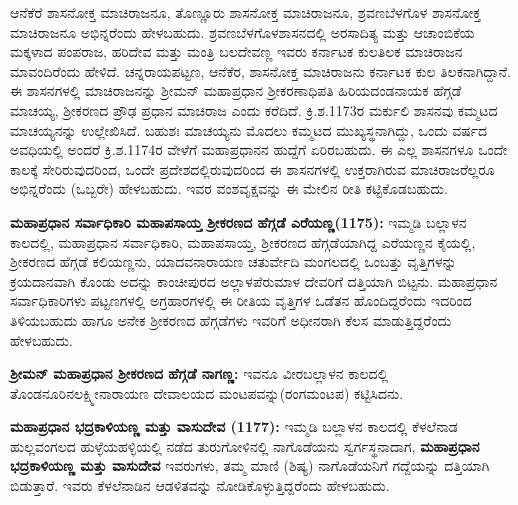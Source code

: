 ಆನೆಕೆರೆ ಶಾಸನೋಕ್ತ ಮಾಚಿರಾಜನೂ, ತೊಣ್ಣೂರು ಶಾಸನೋಕ್ತ ಮಾಚಿರಾಜನೂ, ಶ್ರವಣಬೆಳಗೊಳ ಶಾಸನೋಕ್ತ ಮಾಚಿರಾಜನೂ ಅಭಿನ್ನರೆಂದು ಹೇಳಬಹುದು. ಶ್ರವಣಬೆಳಗೊಳಶಾಸನದಲ್ಲಿ ಅರಸಾದಿತ್ಯ ಮತ್ತು ಆಚಾಂಬಿಕೆಯ ಮಕ್ಕಳಾದ ಪಂಪರಾಜ, ಹರಿದೇವ ಮತ್ತು ಮಂತ್ರಿ ಬಲದೇವಣ್ಣ ಇವರು ಕರ್ನಾಟಕ ಕುಲತಿಲಕ ಮಾಚಿರಾಜನ ಮಾವಂದಿರೆಂದು ಹೇಳಿದೆ. ಚನ್ನರಾಯಪಟ್ಟಣ, ಆನೆಕೆರ, ಶಾಸನೋಕ್ತ ಮಾಚಿರಾಜನು ಕರ್ನಾಟಕ ಕುಲ ತಿಲಕನಾಗಿದ್ದಾನೆ. ಈ ಶಾಸನಗಳಲ್ಲಿ ಮಾಚಿರಾಜನನ್ನು ಶ‍್ರೀಮನ್​ ಮಹಾಪ್ರಧಾನ ಶ‍್ರೀಕರಣಾಧಿಪತಿ ಹಿರಿಯದಂಡನಾಯಕ ಹೆಗ್ಗಡೆ ಮಾಚಯ್ಯ, ಶ‍್ರೀಕರಣದ ಪ್ರೌಢ ಪ್ರಧಾನ ಮಾಚಿರಾಜ ಎಂದು ಕರೆದಿದೆ. ಕ್ರಿ.ಶ.1173ರ ಮರ್ಕುಲಿ ಶಾಸನವು ಕಮ್ಮಟದ ಮಾಚಯ್ಯನನ್ನು ಉಲ್ಲೇಖಿಸಿದೆ. ಬಹುಶಃ ಮಾಚಯ್ಯನು ಮೊದಲು ಕಮ್ಮಟದ ಮುಖ್ಯಸ್ಥನಾಗಿದ್ದು, ಒಂದು ವರ್ಷದ ಅವಧಿಯಲ್ಲಿ ಅಂದರೆ ಕ್ರಿ.ಶ.1174ರ ವೇಳೆಗೆ ಮಹಾಪ್ರಧಾನನ ಹುದ್ದೆಗೆ ಏರಿರಬಹುದು. ಈ ಎಲ್ಲ ಶಾಸನಗಳೂ ಒಂದೇ ಕಾಲಕ್ಕೆ ಸೇರಿರುವುದರಿಂದ, ಒಂದೇ ಪ್ರದೇಶದಲ್ಲಿರುವುದರಿಂದ ಈ ಶಾಸನಗಳಲ್ಲಿ ಉಕ್ತರಾಗಿರುವ ಮಾಚಿರಾಜರೆಲ್ಲರೂ ಅಭಿನ್ನರೆಂದು (ಒಬ್ಬರೇ) ಹೇಳಬಹುದು. ಇವರ ವಂಶವೃಕ್ಷವನ್ನು ಈ ಮೇಲಿನ ರೀತಿ ಕಟ್ಟಿಕೊಡಬಹುದು.

\textbf{ಮಹಾಪ್ರಧಾನ ಸರ್ವಾಧಿಕಾರಿ ಮಹಾಪಸಾಯ್ತ ಶ‍್ರೀಕರಣದ ಹೆಗ್ಗಡೆ ಎರೆಯಣ್ಣ(1175):} ಇಮ್ಮಡಿ ಬಲ್ಲಾಳನ ಕಾಲದಲ್ಲಿ, ಮಹಾಪ್ರಧಾನ ಸರ್ವಾಧಿಕಾರಿ, ಮಹಾಪಸಾಯ್ತ, ಶ‍್ರೀಕರಣದ ಹೆಗ್ಗಡೆಯಾಗಿದ್ದ ಎರೆಯಣ್ಣನ ಕೈಯಲ್ಲಿ, ಶ‍್ರೀಕರಣದ ಹೆಗ್ಗಡೆ ಕಲಿಯಣ್ಣನು, ಯಾದವನಾರಾಯಣ ಚತುರ್ವೇದಿ ಮಂಗಲದಲ್ಲಿ ಒಂಬತ್ತು ವೃತ್ತಿಗಳನ್ನು ಕ್ರಯದಾನವಾಗಿ ಕೊಂಡು ಅದನ್ನು ಕಾಂಚೀಪುರದ ಅಲ್ಲಾಳಪೆರುಮಾಳ ದೇವರಿಗೆ ದತ್ತಿಯಾಗಿ ಬಿಟ್ಟನು. ಮಹಾಪ್ರಧಾನ ಸರ್ವಾಧಿಕಾರಿಗಳು ಪಟ್ಟಣಗಳಲ್ಲಿ ಅಗ್ರಹಾರಗಳಲ್ಲಿ ಈ ರೀತಿಯ ವೃತ್ತಿಗಳ ಒಡೆತನ ಹೊಂದಿದ್ದರೆಂದು ಇದರಿಂದ ತಿಳಿಯಬಹುದು ಹಾಗೂ ಅನೇಕ ಶ‍್ರೀಕರಣದ ಹೆಗ್ಗಡೆಗಳು ಇವರಿಗೆ ಅಧೀನರಾಗಿ ಕೆಲಸ ಮಾಡುತ್ತಿದ್ದರೆಂದು ಹೇಳಬಹುದು.

\textbf{ಶ‍್ರೀಮನ್​ ಮಹಾಪ್ರಧಾನ ಶ‍್ರೀಕರಣದ ಹೆಗ್ಗಡೆ ನಾಗಣ್ಣ:} ಇವನೂ ವೀರಬಲ್ಲಾಳನ ಕಾಲದಲ್ಲಿ ತೊಂಡನೂರಿನ\break ಲಕ್ಷ್ಮೀನಾರಾಯಣ ದೇವಾಲಯದ ಮಂಟಪವನ್ನು(ರಂಗಮಂಟಪ) ಕಟ್ಟಿಸಿದನು.

\textbf{ಮಹಾಪ್ರಧಾನ ಭದ್ರಕಾಳಿಯಣ್ಣ ಮತ್ತು ವಾಸುದೇವ (1177):} ಇಮ್ಮಡಿ ಬಲ್ಲಾಳನ ಕಾಲದಲ್ಲಿ ಕೆಳಲೆನಾಡ ಹುಲ್ಲವಂಗಲದ ಹುಳ್ಳೆಯಹಳ್ಳಿಯಲ್ಲಿ ನಡೆದ ತುರುಗೋಳಿನಲ್ಲಿ ನಾಗೊಡೆಯನು ಸ್ವರ್ಗಸ್ಥನಾದಾಗ, \textbf{ಮಹಾಪ್ರಧಾನ\general{\break } ಭದ್ರಕಾಳಿಯಣ್ಣ ಮತ್ತು ವಾಸುದೇವ} ಇವರುಗಳು, ತಮ್ಮ ಮಾಣಿ (ಶಿಷ್ಯ) ನಾಗೊಡೆಯನಿಗೆ ಗದ್ದೆಯನ್ನು ದತ್ತಿಯಾಗಿ ಬಿಡುತ್ತಾರೆ. ಇವರು ಕೆಳಲೆನಾಡಿನ ಆಡಳಿತವನ್ನು ನೋಡಿಕೊಳ್ಳುತ್ತಿದ್ದರೆಂದು ಹೇಳಬಹುದು.

